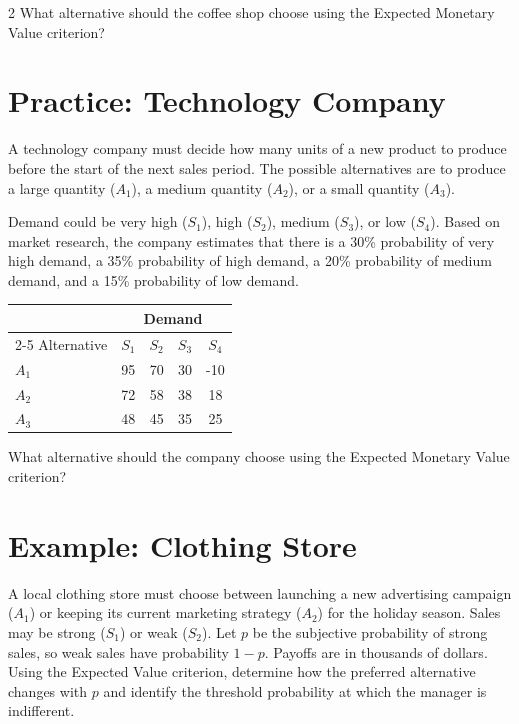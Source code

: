 \begin{multicols}{2}
	What alternative should the coffee shop choose using the Expected
	Monetary Value criterion?\vspace{-4mm}
	
	\section{Practice: Technology Company}
	
	A technology company must decide how many units of a new product to
	produce before the start of the next sales period.
	The possible alternatives are to
	produce a large quantity ($A_1$),
	a medium quantity ($A_2$),
	or a small quantity ($A_3$).
	
	Demand could be very high ($S_1$), high ($S_2$), medium ($S_3$), or low ($S_4$).
	Based on market research, the company estimates that there is
	a 30\% probability of very high demand,
	a 35\% probability of high demand,
	a 20\% probability of medium demand,
	and a 15\% probability of low demand.
	\begin{center}
		\renewcommand{\arraystretch}{1.3}
		\small
		\begin{tabular}{lcccc}
			\toprule
			& \multicolumn{4}{c}{Demand} \\
			\cmidrule(lr){2-5}
			Alternative & $S_1$ & $S_2$ & $S_3$ & $S_4$ \\
			\midrule
			$A_1$ & 95 & 70 & 30 & -10 \\
			$A_2$ & 72 & 58 & 38 & 18 \\
			$A_3$ & 48 & 45 & 35 & 25 \\
			\bottomrule
		\end{tabular}
	\end{center}
	
	What alternative should the company choose using the Expected
	Monetary Value criterion? \vspace{-3mm}
	
	\columnbreak
	\section{Example: Clothing Store}
	A local clothing store must choose between launching a new advertising campaign ($A_1$) or keeping its current marketing strategy ($A_2$) for the holiday season. Sales may be strong ($S_1$) or weak ($S_2$). Let $p$ be the subjective probability of strong sales, so weak sales have probability $1-p$. Payoffs are in thousands of dollars. Using the Expected Value criterion, determine how the preferred alternative changes with $p$ and identify the threshold probability at which the manager is indifferent.
	

\end{multicols}
